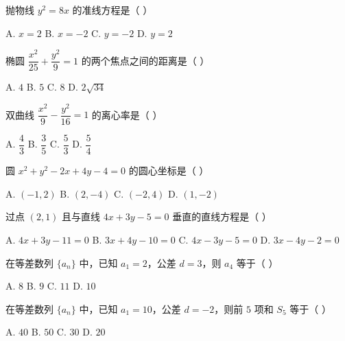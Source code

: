 \documentclass[11pt, a4paper]{article}
\begin{document}
\begin{baitap}[15]
抛物线 $y^2 = 8x$ 的准线方程是（ ）
\par\vspace{3pt}
\noindent A. $x = 2$ \quad B. $x = -2$ \quad C. $y = -2$ \quad D. $y = 2$
\end{baitap}

\begin{baitap}[16]
椭圆 $\dfrac{x^2}{25} + \dfrac{y^2}{9} = 1$ 的两个焦点之间的距离是（ ）
\par\vspace{3pt}
\noindent A. $4$ \quad B. $5$ \quad C. $8$ \quad D. $2\sqrt{34}$
\end{baitap}

\begin{baitap}[17]
双曲线 $\dfrac{x^2}{9} - \dfrac{y^2}{16} = 1$ 的离心率是（ ）
\par\vspace{3pt}
\noindent A. $\dfrac{4}{3}$ \quad B. $\dfrac{3}{5}$ \quad C. $\dfrac{5}{3}$ \quad D. $\dfrac{5}{4}$
\end{baitap}

\begin{baitap}[18]
圆 $x^2 + y^2 - 2x + 4y - 4 = 0$ 的圆心坐标是（ ）
\par\vspace{3pt}
\noindent A. $(-1, 2)$ \quad B. $(2, -4)$ \quad C. $(-2, 4)$ \quad D. $(1, -2)$
\end{baitap}

\begin{baitap}[19]
过点 $(2, 1)$ 且与直线 $4x + 3y - 5 = 0$ 垂直的直线方程是（ ）
\par\vspace{3pt}
\noindent A. $4x + 3y - 11 = 0$ \quad B. $3x + 4y - 10 = 0$ \quad C. $4x - 3y - 5 = 0$ \quad D. $3x - 4y - 2 = 0$
\end{baitap}

\begin{baitap}[20]
在等差数列 $\{a_n\}$ 中，已知 $a_1 = 2$，公差 $d = 3$，则 $a_4$ 等于（ ）
\par\vspace{3pt}
\noindent A. $8$ \quad B. $9$ \quad C. $11$ \quad D. $10$
\end{baitap}

\begin{baitap}[21]
在等差数列 $\{a_n\}$ 中，已知 $a_1 = 10$，公差 $d = -2$，则前 $5$ 项和 $S_5$ 等于（ ）
\par\vspace{3pt}
\noindent A. $40$ \quad B. $50$ \quad C. $30$ \quad D. $20$
\end{baitap}
\end{document}
